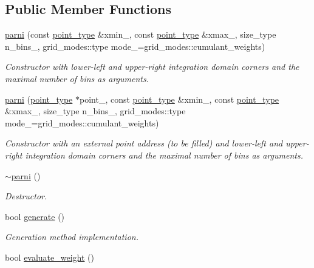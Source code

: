 \subsection*{Public Member Functions}
\begin{DoxyCompactItemize}
\item 
\hyperlink{a00384_aab27660ed0781afebc19b29351e2b7a6}{parni} (const \hyperlink{a00559}{point\-\_\-type} \&xmin\-\_\-, const \hyperlink{a00559}{point\-\_\-type} \&xmax\-\_\-, size\-\_\-type n\-\_\-bins\-\_, grid\-\_\-modes\-::type mode\-\_\-=grid\-\_\-modes\-::cumulant\-\_\-weights)
\begin{DoxyCompactList}\small\item\em Constructor with lower-\/left and upper-\/right integration domain corners and the maximal number of bins as arguments. \end{DoxyCompactList}\item 
\hyperlink{a00384_a647fec26e91833272c29989c7cc81f93}{parni} (\hyperlink{a00559}{point\-\_\-type} $\ast$point\-\_\-, const \hyperlink{a00559}{point\-\_\-type} \&xmin\-\_\-, const \hyperlink{a00559}{point\-\_\-type} \&xmax\-\_\-, size\-\_\-type n\-\_\-bins\-\_, grid\-\_\-modes\-::type mode\-\_\-=grid\-\_\-modes\-::cumulant\-\_\-weights)
\begin{DoxyCompactList}\small\item\em Constructor with an external point address (to be filled) and lower-\/left and upper-\/right integration domain corners and the maximal number of bins as arguments. \end{DoxyCompactList}\item 
\hypertarget{a00384_a35aeae295db8a2f2eda357447ddf0bc6}{\hyperlink{a00384_a35aeae295db8a2f2eda357447ddf0bc6}{$\sim$parni} ()}\label{a00384_a35aeae295db8a2f2eda357447ddf0bc6}

\begin{DoxyCompactList}\small\item\em Destructor. \end{DoxyCompactList}\item 
\hypertarget{a00384_a8f5d9b6ff37970fad506e1ca6e320f64}{bool \hyperlink{a00384_a8f5d9b6ff37970fad506e1ca6e320f64}{generate} ()}\label{a00384_a8f5d9b6ff37970fad506e1ca6e320f64}

\begin{DoxyCompactList}\small\item\em Generation method implementation. \end{DoxyCompactList}\item 
\hypertarget{a00384_acb2fd9b5325ccac36685b2d5e209d0fa}{bool \hyperlink{a00384_acb2fd9b5325ccac36685b2d5e209d0fa}{evaluate\-\_\-weight} ()}\label{a00384_acb2fd9b5325ccac36685b2d5e209d0fa}


\end{DoxyCompactItemize}
